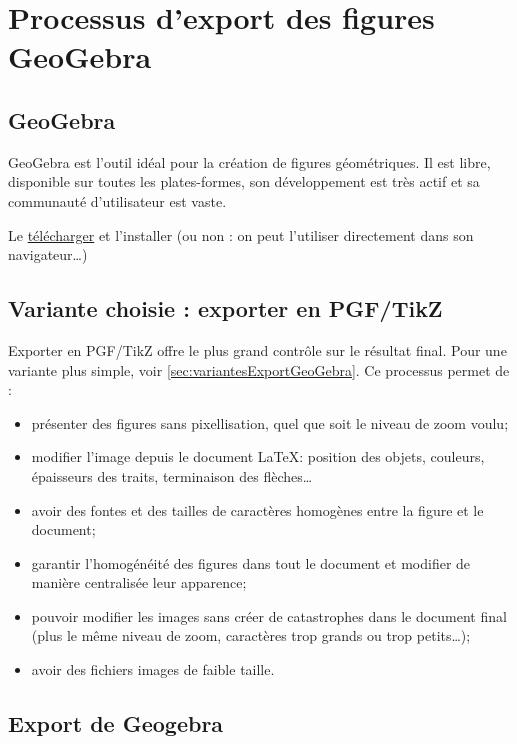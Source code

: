 \section{Processus d'export des figures GeoGebra}



\subsection{GeoGebra}

GeoGebra est l'outil idéal pour la création de figures géométriques. Il est libre, disponible sur toutes les plates-formes, son développement est très actif et sa communauté d'utilisateur est vaste.

Le \href{http://www.geogebra.org/download}{télécharger} et l'installer (ou non : on peut l'utiliser directement dans son navigateur\dots)




\subsection{Variante choisie : exporter en PGF/TikZ}

Exporter en PGF/TikZ offre le plus grand contrôle sur le résultat final. Pour une variante plus simple, voir \ref{sec:variantesExportGeoGebra}. Ce processus permet de :

\begin{itemize}
	\item présenter des figures sans pixellisation, quel que soit le niveau de zoom voulu;
	\item modifier l'image depuis le document \LaTeX : position des objets, couleurs, épaisseurs des traits, terminaison des flèches\dots
	\item avoir des fontes et des tailles de caractères homogènes entre la figure et le document;	
	\item garantir l'homogénéité des figures dans tout le document et modifier de manière centralisée leur apparence;
	\item pouvoir modifier les images sans créer de catastrophes dans le document final (plus le même niveau de zoom, caractères trop grands ou trop petits\dots);
	\item avoir des fichiers images de faible taille.
\end{itemize}



\subsection{Export de Geogebra}
\label{sec:exportDeGeogebra}

